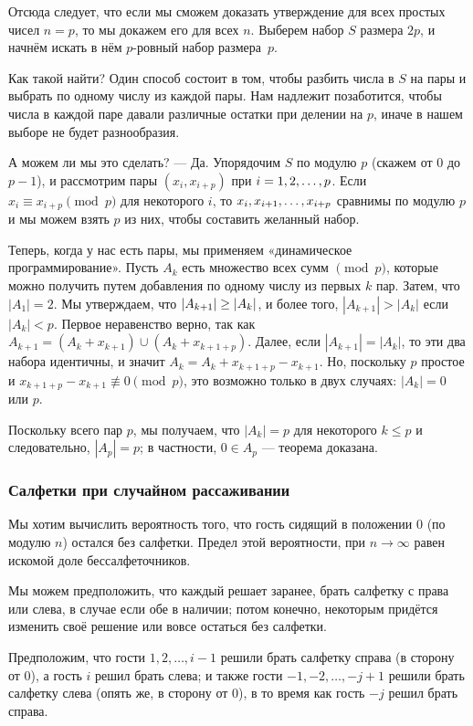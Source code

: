 Отсюда следует, что если мы сможем доказать утверждение для всех простых чисел $n=p$, то мы докажем его для всех $n$.
Выберем набор $S$ размера $2p$, и начнём искать в нём $p$-ровный набор размера~$p$.

Как такой найти?
Один способ состоит в том, чтобы разбить числа в $S$ на пары и выбрать по одному числу из каждой пары.
Нам  надлежит позаботится, чтобы числа в каждой паре давали различные остатки при делении на $p$, иначе в нашем выборе не будет разнообразия.

А можем ли мы это сделать? --- Да.
Упорядочим $S$ по модулю $p$ (скажем от $0$ до $p-1$), и рассмотрим пары $(x_i,x_{i+p})$ при $i\z=1,2,\dots, p$.
Если $x_i\equiv x_{i+p}\pmod p$ для некоторого $i$, то $x_i,x_{i+1},\z\dots,x_{i+p}$ сравнимы по модулю $p$ и мы можем взять $p$ из них, чтобы составить желанный набор.

Теперь, когда у нас есть пары, мы применяем «динамическое программирование».
Пусть $A_k$ есть множество всех сумм $\pmod p$, которые можно получить путем добавления по одному числу из первых $k$ пар.
Затем, что $|A_1|= 2$.
Мы утверждаем, что $|A_{k+1}|\z\ge|A_k|$, и более того, $|A_{k+1}|>|A_k|$ если $|A_k|< p$.
Первое неравенство верно, так как $A_{k+1} = (A_k+x_{k+1}) \cup (A_k+x_{k+1+p})$.
Далее, если $|A_{k+1}|=|A_k|$, то эти два набора идентичны, и значит  $A_k = A_k+x_{k+1+p}-x_{k+1}$.
Но, поскольку $p$ простое и $x_{k+1+p}-x_{k+1}\not\equiv 0\pmod p$, это возможно только в двух случаях: $|A_k|= 0$ или $p$.

Поскольку всего пар $p$, мы получаем, что $|A_k|= p$ для некоторого $k \le p$ и следовательно, $|A_p|= p$; в частности, $0\in A_p$ --- теорема доказана. \heart

\subsubsection*{Салфетки при случайном рассаживании}

Мы хотим вычислить вероятность того, что гость сидящий в положении 0 (по модулю $n$) остался без салфетки.
Предел этой вероятности, при $n\to\infty$ равен искомой доле бессалфеточников.

Мы можем предположить, что каждый решает заранее, брать салфетку с права или слева, в случае если обе в наличии;
потом конечно, некоторым придётся изменить своё решение или вовсе остаться без салфетки.

Предположим, что гости $1,2,\dots, i - 1$ решили брать салфетку справа  (в сторону от 0), а гость $i$ решил брать слева;
и также гости $-1,-2,\dots, -j + 1$ решили брать салфетку слева (опять же, в сторону от 0), в то время как гость $-j$ решил брать справа.

